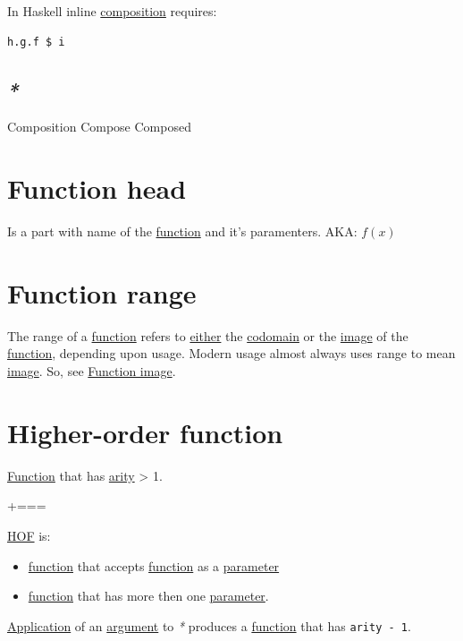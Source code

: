 \documentclass[a4paper,14pt,oneside]{book}
\newcommand{\additional}{{\scriptsize +===}}    %
\begin{document}
In Haskell inline \hyperref[org1b47f42]{composition} requires:
\begin{verbatim}
h.g.f $ i
\end{verbatim}

\subsection{\emph{*}}
\label{sec:orge5004dc}

\label{org5b48576}Composition
\label{org442d3d5}Compose
\label{org8a0eae0}Composed

\section{\label{org0eb9a26}Function head}
\label{sec:org381950e}
Is a part with name of the \hyperref[org679af45]{function} and it's paramenters.
AKA: \(f(x)\)

\section{\label{org911a3c2}Function range}
\label{sec:org618dcfd}
The range of a \hyperref[org679af45]{function} refers to \hyperref[orga6f38ad]{either} the \hyperref[org5ec3963]{codomain} or the \hyperref[orgcf22927]{image} of the \hyperref[org679af45]{function}, depending upon usage. Modern usage almost always uses range to mean \hyperref[orgcf22927]{image}.
So, see \hyperref[org2d3ba55]{Function image}.

\section{\label{org1146033}Higher-order function}
\label{sec:org0304425}
\hyperref[org679af45]{Function} that has \hyperref[org878f88d]{arity} > 1.

\additional

\hyperref[orgdbdec57]{HOF} is:
\begin{itemize}
\item \hyperref[org679af45]{function} that accepts \hyperref[org679af45]{function} as a \hyperref[orgae9d304]{parameter}
\item \hyperref[org679af45]{function} that has more then one \hyperref[orgae9d304]{parameter}.
\end{itemize}

\hyperref[org59dd450]{Application} of an \hyperref[org4072c80]{argument} to \emph{*} produces a \hyperref[org679af45]{function} that has \texttt{arity - 1}.
\end{document}
